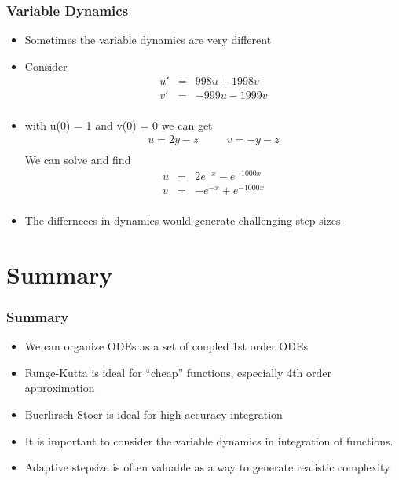 \documentclass[10pt]{beamer}
\begin{document}
\begin{frame}
  \frametitle{Variable Dynamics}
  \begin{itemize}
  \item Sometimes the variable dynamics are very different
  \item Consider
    \[
      \begin{array}{rcl}
        u' & = & 998 u + 1998 v\\
        v' & = & -999u - 1999 v\\
      \end{array}
    \]
  \item with u(0) = 1 and v(0) = 0 we can get
    \[
      \begin{array}{rcl}
        u = 2 y - z & \mbox{~~~}& v = -y -z \\
      \end{array}
    \]
    We can solve and find
    \[
      \begin{array}{rcl}
        u & = & 2 e^{-x} - e^{-1000x}\\
        v & = & - e^{-x} + e^{-1000x}\\
      \end{array}
    \]
  \item The differneces in dynamics would generate challenging step sizes
  \end{itemize}
\end{frame}

\section{Summary}

\begin{frame}
  \frametitle{Summary}
  \begin{itemize}
  \item We can organize ODEs as a set of coupled 1st order ODEs
  \item Runge-Kutta is ideal for ``cheap'' functions, especially 4th
    order approximation
  \item Buerlirsch-Stoer is ideal for high-accuracy integration
  \item It is important to consider the variable dynamics in
    integration of functions.
  \item Adaptive stepsize is often valuable as a way to generate
    realistic complexity
  \end{itemize}
\end{frame}
\end{document}
